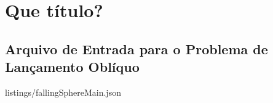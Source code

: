 \chapter{\alert{Que título?}} \label{app:code_listings}

\section{Arquivo de Entrada para o Problema de Lançamento Oblíquo}


	{listings/fallingSphereMain.json}

